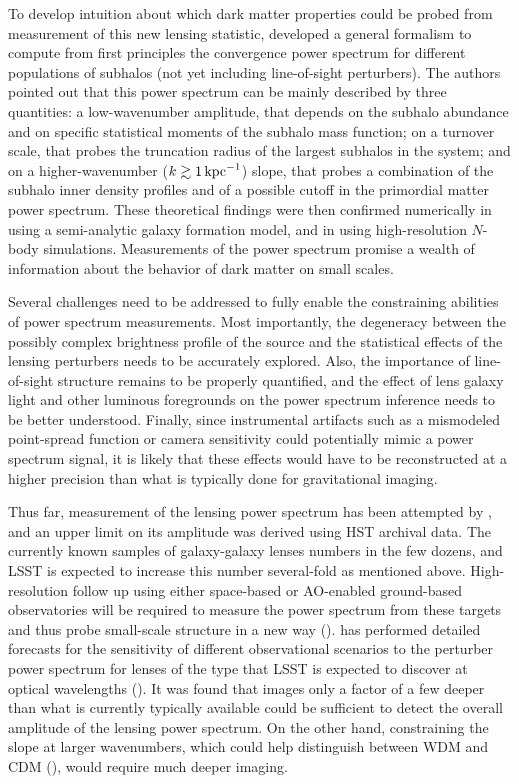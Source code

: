 To develop intuition about which dark matter properties could be probed from measurement of this new lensing statistic, \cite{Rivero:2017mao} developed a general formalism to compute from first principles the convergence power spectrum for different populations of subhalos (not yet including line-of-sight perturbers). The authors pointed out that this power spectrum can be mainly described by three quantities: a low-wavenumber amplitude, that depends on the subhalo abundance and on specific statistical moments of the subhalo mass function; on a turnover scale, that probes the truncation radius of the largest subhalos in the system; and on a higher-wavenumber ($k\gtrsim 1 \mathrm{\,kpc}^{-1}$) slope, that probes a combination of the subhalo inner density profiles and of a possible cutoff in the primordial matter power spectrum. These theoretical findings were then confirmed numerically in \cite{Brennan:2018jhq} using a semi-analytic galaxy formation model, and in \cite{Rivero:2018bcd} using high-resolution $N$-body simulations. Measurements of the power spectrum promise a wealth of information about the behavior of dark matter on small scales.

Several challenges need to be addressed to fully enable the constraining abilities of power spectrum measurements. Most importantly, the degeneracy between the possibly complex brightness profile of the source and the statistical effects of the lensing perturbers needs to be accurately explored. Also, the importance of line-of-sight structure remains to be properly quantified, and the effect of lens galaxy light and other luminous foregrounds on the power spectrum inference needs to be better understood. Finally, since instrumental artifacts such as a mismodeled point-spread function or camera sensitivity could potentially mimic a power spectrum signal, it is likely that these effects would have to be reconstructed at a higher precision than what is typically done for gravitational imaging. 

Thus far, measurement of the lensing power spectrum has been attempted by \cite{Bayer:2018vhy}, and an upper limit on its amplitude was derived using HST archival data. The currently known samples of galaxy-galaxy lenses numbers in the few dozens, and LSST is expected to increase this number several-fold as mentioned above. High-resolution follow up using either space-based or AO-enabled ground-based observatories will be required to measure the power spectrum from these targets and thus probe small-scale structure in a new way (). \citet{Cyr-Racine:2018htu} has performed detailed forecasts for the sensitivity of different observational scenarios to the perturber power spectrum for lenses of the type that LSST is expected to discover at optical wavelengths (). It was found that images only a factor of a few deeper than what is currently typically available \citep[\eg, from the SLACS sample][]{Bolton2008} could be sufficient to detect the overall amplitude of the lensing power spectrum. On the other hand, constraining the slope at larger wavenumbers, which could help distinguish between WDM and CDM (), would require much deeper imaging.

